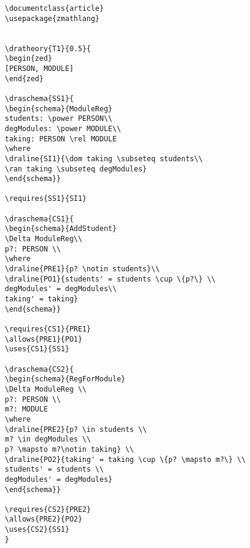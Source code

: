 \begin{verbatim}
\documentclass{article}
\usepackage{zmathlang}


\dratheory{T1}{0.5}{
\begin{zed}
[PERSON, MODULE]
\end{zed}

\draschema{SS1}{
\begin{schema}{ModuleReg}
students: \power PERSON\\
degModules: \power MODULE\\
taking: PERSON \rel MODULE
\where
\draline{SI1}{\dom taking \subseteq students\\
\ran taking \subseteq degModules}
\end{schema}}

\requires{SS1}{SI1}

\draschema{CS1}{
\begin{schema}{AddStudent}
\Delta ModuleReg\\
p?: PERSON \\
\where
\draline{PRE1}{p? \notin students}\\
\draline{PO1}{students' = students \cup \{p?\} \\
degModules' = degModules\\
taking' = taking}
\end{schema}}

\requires{CS1}{PRE1}
\allows{PRE1}{PO1}
\uses{CS1}{SS1}

\draschema{CS2}{
\begin{schema}{RegForModule}
\Delta ModuleReg \\
p?: PERSON \\
m?: MODULE
\where
\draline{PRE2}{p? \in students \\
m? \in degModules \\
p? \mapsto m?\notin taking} \\
\draline{PO2}{taking' = taking \cup \{p? \mapsto m?\} \\
students' = students \\
degModules' = degModules}
\end{schema}}

\requires{CS2}{PRE2}
\allows{PRE2}{PO2}
\uses{CS2}{SS1}
}


\end{verbatim}